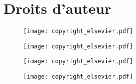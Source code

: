 \chapter{Droits d'auteur}

\begin{figure}[H]
	\centering
  \texttt{[image: copyright\_elsevier.pdf]}
\end{figure}

\begin{figure}[H]
	\centering
  \texttt{[image: copyright\_elsevier.pdf]}
\end{figure}

\begin{figure}[H]
	\centering
  \texttt{[image: copyright\_elsevier.pdf]}
\end{figure}

\begin{figure}[H]
	\centering
  \texttt{[image: copyright\_elsevier.pdf]}
\end{figure}



